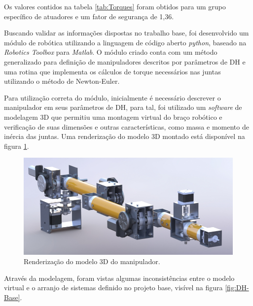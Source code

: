 Os valores contidos na tabela \ref{tab:Torques} foram obtidos para um 
grupo específico de atuadores e um fator de segurança de 1,36.

Buscando validar as informações dispostas no trabalho base, foi desenvolvido 
um módulo de robótica utilizando a linguagem de código aberto \textit{python},
baseado na \textit{Robotics Toolbox} para \textit{Matlab}. O módulo criado 
conta com um método generalizado para definição de manipuladores descritos por
parâmetros de DH e uma rotina que implementa os cálculos de torque necessários
nas juntas utilizando o método de Newton-Euler.

Para utilização correta do módulo, inicialmente é necessário descrever o 
manipulador em seus parâmetros de DH, para tal, foi utilizado um \textit{software}
de modelagem 3D que permitiu uma montagem virtual do braço robótico e 
verificação de suas dimensões e outras características, como massa e momento 
de inércia das juntas. Uma renderização do modelo 3D montado está disponível
na figura \ref{fig:manipulador-render}.

\begin{figure}[htb]
    \caption{Renderização do modelo 3D do manipulador.}    
    \begin{centering}

        \includegraphics[width=0.8\columnwidth]{images/arm/render.jpg}
    
    \par\end{centering}

    \label{fig:manipulador-render}
\end{figure}

Através da modelagem, foram vistas algumas inconsistências
entre o modelo virtual e o arranjo de sistemas definido no projeto base, visível
na figura \ref{fig:DH-Base}. 

